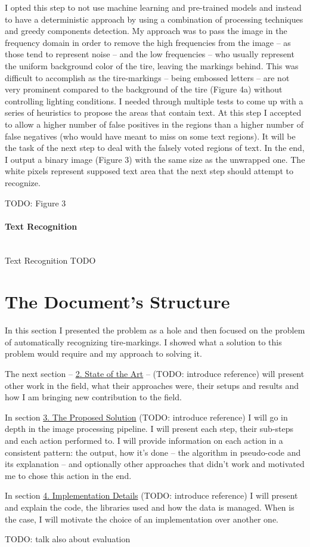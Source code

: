 I opted this step to not use machine learning and pre-trained models and instead to have a deterministic approach by using a combination of processing techniques and greedy components detection. My approach was to pass the image in the frequency domain in order to remove the high frequencies from the image -- as those tend to represent noise -- and the low frequencies -- who usually represent the uniform background color of the tire, leaving the markings behind. This was difficult to accomplish as the tire-markings -- being embossed letters -- are not very prominent compared to the background of the tire (Figure 4a) without controlling lighting conditions. I needed through multiple tests to come up with a series of heuristics to propose the areas that contain text. At this step I accepted to allow a higher number of false positives in the regions than a higher number of false negatives (who would have meant to miss on some text regions). It will be the task of the next step to deal with the falsely voted regions of text. In the end, I output a binary image (Figure 3) with the same size as the unwrapped one. The white pixels represent supposed text area that the next step should attempt to recognize.

TODO: Figure 3

\paragraph*{Text Recognition}\mbox{}\\
Text Recognition
TODO

\section{The Document's Structure}

In this section I presented the problem as a hole and then focused on the problem of automatically recognizing tire-markings. I showed what a solution to this problem would require and my approach to solving it.

The next section -- \hyperref[chap:state-of-the-art]{2. State of the Art} -- (TODO: introduce reference) will present other work in the field, what their approaches were, their setups and results and how I am bringing new contribution to the field.

In section \hyperref[chap:proposed-solution]{3. The Proposed Solution} (TODO: introduce reference) I will go in depth in the image processing pipeline. I will present each step, their sub-steps and each action performed to. I will provide information on each action in a consistent pattern: the output, how it's done -- the algorithm in pseudo-code and its explanation -- and optionally other approaches that didn't work and motivated me to chose this action in the end.

In section \hyperref[chap:implementation-details]{4. Implementation Details} (TODO: introduce reference) I will present and explain the code, the libraries used and how the data is managed. When is the case, I will motivate the choice of an implementation over another one.

TODO: talk also about evaluation
